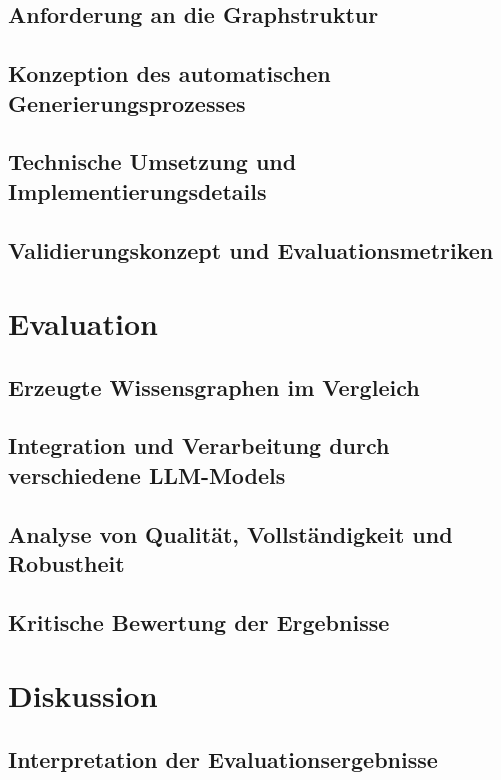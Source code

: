\documentclass[]{stthesis}
\begin{document}
        \section{Anforderung an die Graphstruktur}

        \section{Konzeption des automatischen Generierungsprozesses}

        \section{Technische Umsetzung und Implementierungsdetails}

        \section{Validierungskonzept und Evaluationsmetriken}

    \chapter{Evaluation}
        \section{Erzeugte Wissensgraphen im Vergleich}

        \section{Integration und Verarbeitung durch verschiedene LLM-Models}

        \section{Analyse von Qualität, Vollständigkeit und Robustheit}

        \section{Kritische Bewertung der Ergebnisse}

    \chapter{Diskussion}
        \section{Interpretation der Evaluationsergebnisse}
\end{document}

